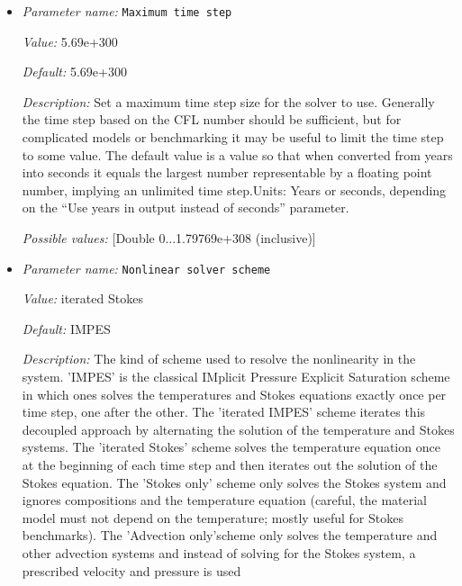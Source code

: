 \begin{itemize}
{\it Value:} 6


{\it Default:} 10


{\it Description:} The maximal number of nonlinear iterations to be performed.


{\it Possible values:} [Integer range 0...2147483647 (inclusive)]
\item {\it Parameter name:} {\tt Maximum time step}
\label{parameters:Maximum time step}


{\it Value:} 5.69e+300


{\it Default:} 5.69e+300


{\it Description:} Set a maximum time step size for the solver to use. Generally the time step based on the CFL number should be sufficient, but for complicated models or benchmarking it may be useful to limit the time step to some value. The default value is a value so that when converted from years into seconds it equals the largest number representable by a floating point number, implying an unlimited time step.Units: Years or seconds, depending on the ``Use years in output instead of seconds'' parameter.


{\it Possible values:} [Double 0...1.79769e+308 (inclusive)]
\item {\it Parameter name:} {\tt Nonlinear solver scheme}
\label{parameters:Nonlinear solver scheme}


{\it Value:} iterated Stokes


{\it Default:} IMPES


{\it Description:} The kind of scheme used to resolve the nonlinearity in the system. 'IMPES' is the classical IMplicit Pressure Explicit Saturation scheme in which ones solves the temperatures and Stokes equations exactly once per time step, one after the other. The 'iterated IMPES' scheme iterates this decoupled approach by alternating the solution of the temperature and Stokes systems. The 'iterated Stokes' scheme solves the temperature equation once at the beginning of each time step and then iterates out the solution of the Stokes equation. The 'Stokes only' scheme only solves the Stokes system and ignores compositions and the temperature equation (careful, the material model must not depend on the temperature; mostly useful for Stokes benchmarks). The 'Advection only'scheme only solves the temperature and other advection systems and instead of solving for the Stokes system, a prescribed velocity and pressure is used



\end{itemize}
